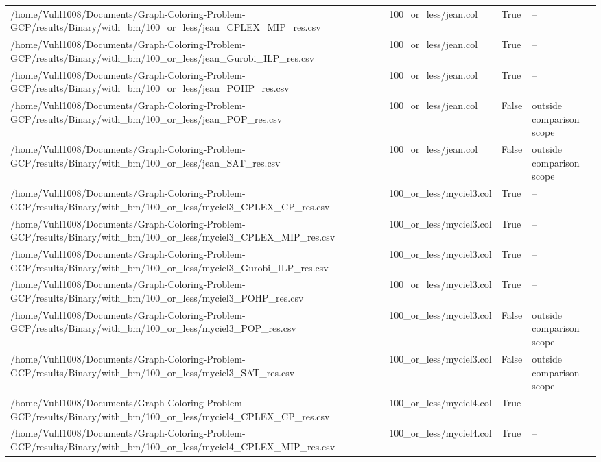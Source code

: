 \begin{table}[htbp]
\begin{tabular}{llll}
/home/Vuhl1008/Documents/Graph-Coloring-Problem-GCP/results/Binary/with\_bm/100\_or\_less/jean\_CPLEX\_MIP\_res.csv & 100\_or\_less/jean.col & True & -- \\
/home/Vuhl1008/Documents/Graph-Coloring-Problem-GCP/results/Binary/with\_bm/100\_or\_less/jean\_Gurobi\_ILP\_res.csv & 100\_or\_less/jean.col & True & -- \\
/home/Vuhl1008/Documents/Graph-Coloring-Problem-GCP/results/Binary/with\_bm/100\_or\_less/jean\_POHP\_res.csv & 100\_or\_less/jean.col & True & -- \\
/home/Vuhl1008/Documents/Graph-Coloring-Problem-GCP/results/Binary/with\_bm/100\_or\_less/jean\_POP\_res.csv & 100\_or\_less/jean.col & False & outside comparison scope \\
/home/Vuhl1008/Documents/Graph-Coloring-Problem-GCP/results/Binary/with\_bm/100\_or\_less/jean\_SAT\_res.csv & 100\_or\_less/jean.col & False & outside comparison scope \\
/home/Vuhl1008/Documents/Graph-Coloring-Problem-GCP/results/Binary/with\_bm/100\_or\_less/myciel3\_CPLEX\_CP\_res.csv & 100\_or\_less/myciel3.col & True & -- \\
/home/Vuhl1008/Documents/Graph-Coloring-Problem-GCP/results/Binary/with\_bm/100\_or\_less/myciel3\_CPLEX\_MIP\_res.csv & 100\_or\_less/myciel3.col & True & -- \\
/home/Vuhl1008/Documents/Graph-Coloring-Problem-GCP/results/Binary/with\_bm/100\_or\_less/myciel3\_Gurobi\_ILP\_res.csv & 100\_or\_less/myciel3.col & True & -- \\
/home/Vuhl1008/Documents/Graph-Coloring-Problem-GCP/results/Binary/with\_bm/100\_or\_less/myciel3\_POHP\_res.csv & 100\_or\_less/myciel3.col & True & -- \\
/home/Vuhl1008/Documents/Graph-Coloring-Problem-GCP/results/Binary/with\_bm/100\_or\_less/myciel3\_POP\_res.csv & 100\_or\_less/myciel3.col & False & outside comparison scope \\
/home/Vuhl1008/Documents/Graph-Coloring-Problem-GCP/results/Binary/with\_bm/100\_or\_less/myciel3\_SAT\_res.csv & 100\_or\_less/myciel3.col & False & outside comparison scope \\
/home/Vuhl1008/Documents/Graph-Coloring-Problem-GCP/results/Binary/with\_bm/100\_or\_less/myciel4\_CPLEX\_CP\_res.csv & 100\_or\_less/myciel4.col & True & -- \\
/home/Vuhl1008/Documents/Graph-Coloring-Problem-GCP/results/Binary/with\_bm/100\_or\_less/myciel4\_CPLEX\_MIP\_res.csv & 100\_or\_less/myciel4.col & True & -- \\

\end{tabular}
\end{table}
